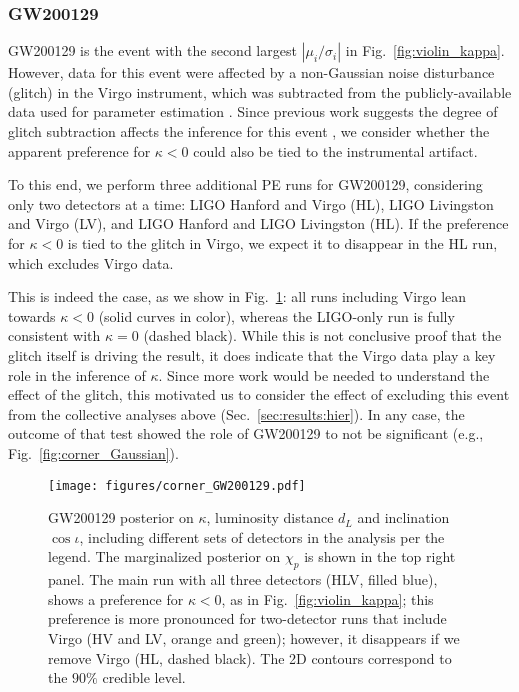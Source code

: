 \documentclass[aps,prd,twocolumn,superscriptaddress,preprintnumbers,floatfix,nofootinbib]{revtex4-2}
\begin{document}
\subsubsection{GW200129}
\label{sec:GW200129}

GW200129 is the event with the second largest $|\mu_i/\sigma_i|$ in Fig.~\ref{fig:violin_kappa}.
However, data for this event were affected by a non-Gaussian noise disturbance (glitch) in the Virgo instrument, which was subtracted from the publicly-available data used for parameter estimation \cite{Davis:2022ird}.
Since previous work suggests the degree of glitch subtraction affects the inference for this event \citep{GW200129_glitch}, we consider whether the apparent preference for $\kappa < 0$ could also be tied to the instrumental artifact.

To this end, we perform three additional \ac{PE} runs for GW200129, considering only two detectors at a time: LIGO Hanford and Virgo (HL), LIGO Livingston and Virgo (LV), and LIGO Hanford and LIGO Livingston (HL).
If the preference for $\kappa < 0$ is tied to the glitch in Virgo, we expect it to disappear in the HL run, which excludes Virgo data.

This is indeed the case, as we show in Fig.~\ref{fig:corner_GW200129}: all runs including Virgo lean towards $\kappa < 0$ (solid curves in color), whereas the LIGO-only run is fully consistent with $\kappa = 0$ (dashed black).
While this is not conclusive proof that the glitch itself is driving the result, it does indicate that the Virgo data play a key role in the inference of $\kappa$.
Since more work would be needed to understand the effect of the glitch, this motivated us to consider the effect of excluding this event from the collective analyses above (Sec.~\ref{sec:results:hier}).
In any case, the outcome of that test showed the role of GW200129 to not be significant (e.g., Fig.~\ref{fig:corner_Gaussian}).

\begin{figure}
    \texttt{[image: figures/corner\_GW200129.pdf]}
    \caption{
        GW200129 posterior on $\kappa$, luminosity distance $d_L$ and inclination $\cos{\iota}$, including different sets of detectors in the analysis per the legend.
        The marginalized posterior on $\chi_p$ is shown in the top right panel.
        The main run with all three detectors (HLV, filled blue), shows a preference for $\kappa < 0$, as in Fig.~\ref{fig:violin_kappa}; this preference is more pronounced for two-detector runs that include Virgo (HV and LV, orange and green); however, it disappears if we remove Virgo (HL, dashed black).
        The 2D contours correspond to the $90\%$ credible level.
    }
    \label{fig:corner_GW200129}
\end{figure}
\end{document}
